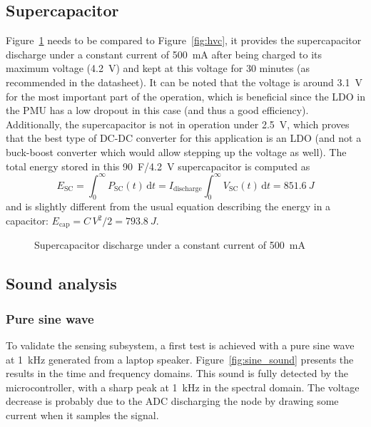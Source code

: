 \documentclass{EPL-master-thesis-covers-EN}
\newcommand{\te}[1]{\textrm{#1}}
\begin{document}
\subsection*{Supercapacitor}

Figure~\ref{fig:discharge_supercap_exp} needs to be compared to Figure~\ref{fig:hvc}, it provides the supercapacitor discharge under a constant current of \SI{500}{mA} after being charged to its maximum voltage (\SI{4.2}{V}) and kept at this voltage for 30 minutes (as recommended in the datasheet). It can be noted that the voltage is around \SI{3.1}{V} for the most important part of the operation, which is beneficial since the LDO in the PMU has a low dropout in this case (and thus a good efficiency). Additionally, the supercapacitor is not in operation under \SI{2.5}{V}, which proves that the best type of DC-DC converter for this application is an LDO (and not a buck-boost converter which would allow stepping up the voltage as well). The total energy stored in this \SI{90}{F}/\SI{4.2}{V} supercapacitor is computed as
\[
 E_\te{SC} = \int_0^\infty P_\te{SC}(t) \, \te{d} t = I_\te{discharge} \int_0^\infty V_\te{SC}(t) \, \te{d} t = \SI{851.6}{J}
\]
and is slightly different from the usual equation describing the energy in a capacitor: $E_\te{cap} = C\,V^2/2 = \SI{793.8}{J}$.

\begin{figure}[H]
    \centering
    
    \caption{Supercapacitor discharge under a constant current of \SI{500}{mA}}
    \label{fig:discharge_supercap_exp}
\end{figure}


\subsection*{Sound analysis}

\subsubsection*{Pure sine wave}

To validate the sensing subsystem, a first test is achieved with a pure sine wave at \SI{1}{kHz} generated from a laptop speaker. Figure~\ref{fig:sine_sound} presents the results in the time and frequency domains. This sound is fully detected by the microcontroller, with a sharp peak at \SI{1}{kHz} in the spectral domain. The voltage decrease is probably due to the ADC discharging the node by drawing some current when it samples the signal.
\end{document}
